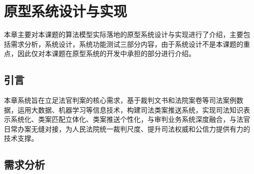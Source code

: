 
\chapter{原型系统设计与实现}
本章主要对本课题的算法模型实际落地的原型系统设计与实现进行了介绍，主要包括需求分析，系统设计，系统功能测试三部分内容，由于系统设计不是本课题的重点，因此仅对本课题在原型系统的开发中承担的部分进行介绍。

\section{引言}
\label{sec:sys_intro}
本章系统旨在立足法官判案的核心需求，基于裁判文书和法院案卷等司法案例数据，运用大数据、机器学习等信息技术，构建司法类案推送系统，实现司法知识表示系统化、类案匹配立体化、类案推送个性化，与审判业务系统深度融合，与法官日常办案无缝对接，为人民法院统一裁判尺度、提升司法权威和公信力提供有力的技术支撑。
\section{需求分析}


